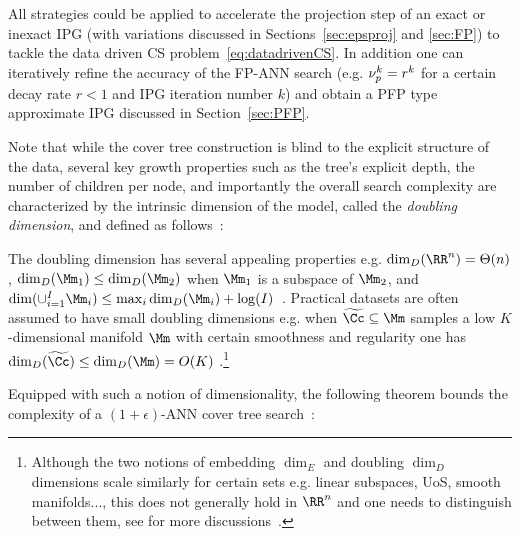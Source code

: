  All strategies could be applied to accelerate the projection step of an exact or inexact IPG (with variations discussed in Sections~\ref{sec:epsproj} and \ref{sec:FP}) to tackle the data driven CS problem~\eqref{eq:datadrivenCS}.  
 In addition one can iteratively refine the accuracy of the FP-ANN search (e.g. $\nu_p^k =r^k$ for a certain decay rate $r<1$ and IPG iteration number $k$) and obtain a PFP type approximate IPG discussed in Section~\ref{sec:PFP}.  
 
Note that while the cover tree construction is blind to the explicit structure of the data, several key growth properties such as the tree's explicit depth, the number of children per node, and importantly the overall search complexity are characterized by the intrinsic dimension of the model, called the \emph{doubling dimension},
and defined as follows~\cite{assouad,heinonen}:

{}
		
The doubling dimension has several 
appealing properties e.g. $\dim_D(\RR^n)=\Theta(n)$, $\dim_D(\Mm_1)\leq \dim_D(\Mm_2)$ when $\Mm_1$ is a subspace of $\Mm_2$, and $\dim(\cup_{i=1}^I \Mm_i)\leq \max_i \dim_D(\Mm_i)+\log(I)$~\cite{heinonen,Navigating}. 
Practical datasets are often assumed to have small doubling dimensions e.g. when $\widetilde \Cc \subseteq \Mm$  %
 samples a low $K$-dimensional manifold $\Mm$ with certain smoothness and regularity one has $\dim_D(\widetilde \Cc)\leq \dim_D(\Mm)=O(K)$ \cite{dasgupta2008}.\footnote{Although the two notions of embedding $\dim_E$ and doubling $\dim_D$ dimensions scale similarly for certain sets e.g. linear subspaces, UoS, smooth manifolds..., this does not generally hold in $\RR^n$ and one needs to distinguish between them,  
see for more discussions~\cite{Indyk:NNembedding,dasgupta2012}.}

Equipped with such a notion of dimensionality, the following theorem bounds the complexity of a  $(1+\epsilon)$-ANN cover tree search~\cite{Navigating,beygelzimer2006cover}: 

